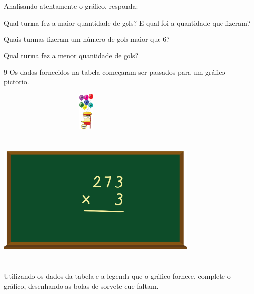 \begin{escolha}
{\begin{escolha}
{Analisando atentamente o gráfico, responda:

\begin{escolha}

\item
  Qual turma fez a maior quantidade de gols? E qual foi a quantidade que
  fizeram?

\item
  Quais turmas fizeram um número de gols maior que 6?

\item
  Qual turma fez a menor quantidade de gols?
\end{escolha}

\num{9} Os dados fornecidos na tabela começaram ser passados para um
gráfico pictório.


\includegraphics[width=3.47436in,height=0.75022in]{media/image98.png}

\includegraphics[width=3.86538in,height=2.63899in]{media/image99.png}

Utilizando os dados da tabela e a legenda que o gráfico fornece,
complete o gráfico, desenhando as bolas de sorvete que faltam.

}
\end{escolha}}
\end{escolha}
